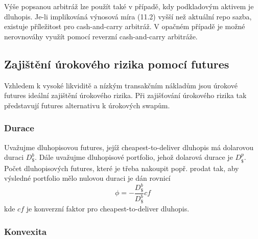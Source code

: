 \documentclass[a4paper]{book}
\begin{document}
Výše popsanou arbitráž lze použít také v případě, kdy podkladovým aktivem je dluhopis. Je-li implikováná výnosová míra (11.2) vyšší než aktuální repo sazba, existuje příležitost pro cash-and-carry arbitráž. V opačném případě je možné nerovnováhy využít pomocí reverzní cash-and-carry arbitráže.

\subsection{Zajištění úrokového rizika pomocí futures}

Vzhledem k vysoké likviditě a nízkým transakčním nákladům jsou úrokové futures ideální zajištění úrokového rizika. Při zajišťování úrokového rizika tak představují futures alternativu k úrokových swapům. 

\subsubsection{Durace}

Uvažujme dluhopisovou futures, jejíž cheapest-to-deliver dluhopis má dolarovou duraci $D_{\$}^b$. Dále uvažujme dluhopisové portfolio, jehož dolarová durace je $D_{\$}^p$. Počet dluhopisových futures, které je třeba nakoupit popř. prodat tak, aby výsledné portfolio mělo nulovou duraci je dán rovnicí
\begin{equation*}
\phi = - \frac{D_{\$}^b}{D_{\$}^b}cf
\end{equation*}
kde $cf$ je konverzní faktor pro cheapest-to-deliver dluhopis.

\subsubsection{Konvexita}
\end{document}
